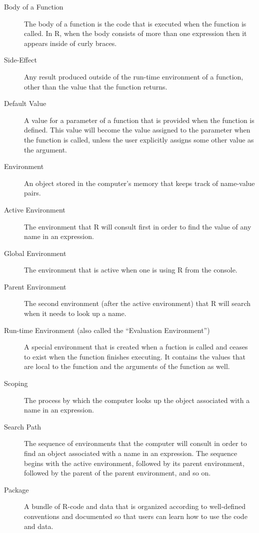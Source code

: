 \documentclass[]{book}
\theoremstyle{definition}
\theoremstyle{definition}
\theoremstyle{remark}
\begin{document}
{\begin{description}
\item[Body of a Function ]
The body of a function is the code that is executed when the function is
called. In R, when the body consists of more than one expression then it
appears inside of curly braces.
\item[Side-Effect ]
Any result produced outside of the run-time environment of a function,
other than the value that the function returns.
\item[Default Value ]
A value for a parameter of a function that is provided when the function
is defined. This value will become the value assigned to the parameter
when the function is called, unless the user explicitly assigns some
other value as the argument.
\item[Environment ]
An object stored in the computer's memory that keeps track of name-value
pairs.
\item[Active Environment ]
The environment that R will consult first in order to find the value of
any name in an expression.
\item[Global Environment ]
The environment that is active when one is using R from the console.
\item[Parent Environment ]
The second environment (after the active environment) that R will search
when it needs to look up a name.
\item[Run-time Environment (also called the ``Evaluation Environment'')
]
A special environment that is created when a fuction is called and
ceases to exist when the function finishes executing. It contains the
values that are local to the function and the arguments of the function
as well.
\item[Scoping ]
The process by which the computer looks up the object associated with a
name in an expression.
\item[Search Path ]
The sequence of environments that the computer will consult in order to
find an object associated with a name in an expression. The sequence
begins with the active environment, followed by its parent environment,
followed by the parent of the parent environment, and so on.
\item[Package ]
A bundle of R-code and data that is organized according to well-defined
conventions and documented so that users can learn how to use the code
and data.
\end{description}

}
\end{document}
